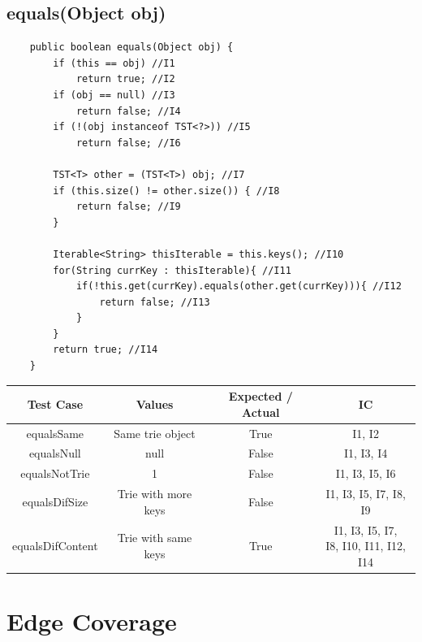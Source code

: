 \documentclass[12pt]{article}
\begin{document}
\subsection{equals(Object obj)}
\begin{lstlisting}
	public boolean equals(Object obj) {
		if (this == obj) //I1
			return true; //I2
		if (obj == null) //I3
			return false; //I4
		if (!(obj instanceof TST<?>)) //I5
			return false; //I6
		
		TST<T> other = (TST<T>) obj; //I7
		if (this.size() != other.size()) { //I8
			return false; //I9
		}
			
		Iterable<String> thisIterable = this.keys(); //I10
        for(String currKey : thisIterable){ //I11
            if(!this.get(currKey).equals(other.get(currKey))){ //I12
                return false; //I13
            }
        }
		return true; //I14
	}
\end{lstlisting}

\begin{table}[htb]
\centering
\begin{tabular}{| c | c | c | c |} 
 \hline
 Test Case & Values & Expected / Actual & IC\\ \hline
 equalsSame & Same trie object & True & I1, I2 \\ \hline
 equalsNull & null & False & I1, I3, I4 \\ \hline
 equalsNotTrie & 1 & False & I1, I3, I5, I6 \\ \hline
 equalsDifSize & Trie with more keys & False & I1, I3, I5, I7, I8, I9 \\ \hline
 equalsDifContent & Trie with same keys & True & \makecell{I1, I3, I5, I7, 
 \\ I8, I10, I11, I12, I14} \\ \hline
\end{tabular}
\end{table}

\newpage
\section{Edge Coverage}
\end{document}
